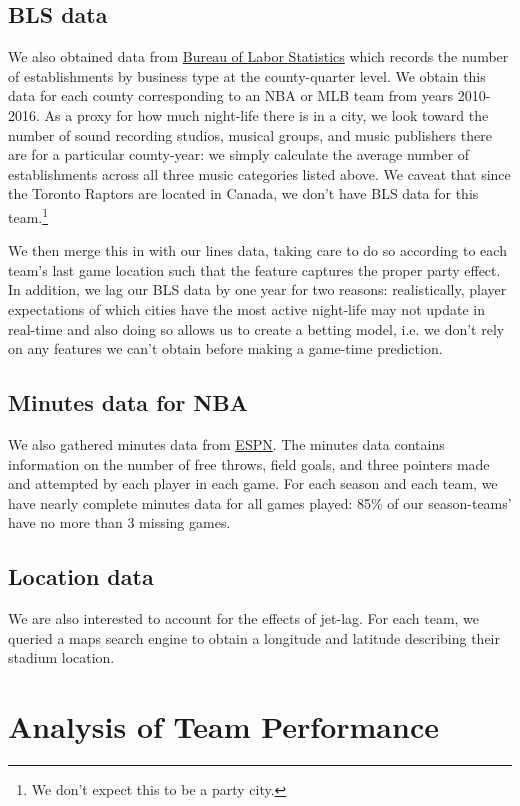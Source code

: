 \documentclass[letterpaper,12pt]{article}
\begin{document}
\subsection{BLS data} We also obtained data from
\href{https://www.bls.gov/data/}{Bureau of Labor Statistics} which records the number of establishments by business type at the county-quarter level. We obtain this data for each county corresponding
to an NBA or MLB team from years 2010-2016. 
As a proxy for how much night-life there is in a city, we look toward the 
number of sound recording studios, musical groups, and music publishers there 
are for a particular county-year: we simply calculate the average number of establishments across all three music categories listed above. We caveat that since the Toronto Raptors are located in Canada, we don't have BLS data for this team.\footnote{We don't expect this to be a party city.}

We then merge this in with our lines data, taking care to do so according to each team's last game location such that the feature captures the proper
party effect. In addition, we lag our BLS data by one year for two reasons:
realistically, player expectations of which cities have the most active night-life may not
update in real-time and also doing so allows us to create a betting model, i.e.
we don't rely on any features we can't obtain before making a game-time prediction. 

\subsection{Minutes data for NBA}
We also gathered minutes data from \href{http://www.espn.com/nba/scoreboard/_/date/}{ESPN}.
The minutes data contains information on the number of free throws, field goals, and three pointers made and attempted by each player in each game.
For each season and each team, we have nearly complete 
minutes data for all games played: 85\% of our season-teams' have no more than 3 missing games.

\subsection{Location data} We are also interested
to account for the effects of jet-lag. For each team, we queried
a maps search engine to obtain a longitude and latitude describing their
stadium location.\citep{ggmap}

\section{Analysis of Team Performance}
\end{document}
